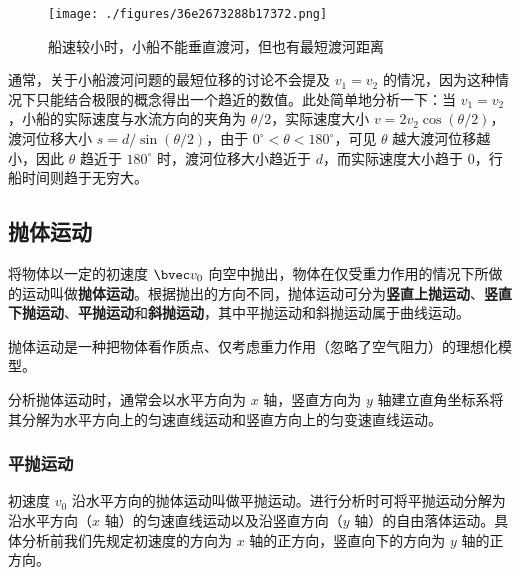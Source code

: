 \begin{figure}[ht]
\centering
\texttt{[image: ./figures/36e2673288b17372.png]}
\caption{船速较小时，小船不能垂直渡河，但也有最短渡河距离} \label{fig_HSPM04_2}
\end{figure}

通常，关于小船渡河问题的最短位移的讨论不会提及 $v_1=v_2$ 的情况，因为这种情况下只能结合极限的概念得出一个趋近的数值。此处简单地分析一下：当 $v_1=v_2$，小船的实际速度与水流方向的夹角为 $\theta /2$，实际速度大小 $v=2v_2\cos(\theta /2)$，渡河位移大小 $s= d/\sin(\theta/2)$，由于 $0^\circ < \theta < 180^\circ $，可见 $\theta$ 越大渡河位移越小，因此 $\theta$ 趋近于 $180^\circ $ 时，渡河位移大小趋近于 $d$，而实际速度大小趋于 $0$，行船时间则趋于无穷大。

\subsection{抛体运动}
将物体以一定的初速度 $\bvec v_0$ 向空中抛出，物体在仅受重力作用的情况下所做的运动叫做\textbf{抛体运动}。根据抛出的方向不同，抛体运动可分为\textbf{竖直上抛运动}、\textbf{竖直下抛运动}、\textbf{平抛运动}和\textbf{斜抛运动}，其中平抛运动和斜抛运动属于曲线运动。

抛体运动是一种把物体看作质点、仅考虑重力作用（忽略了空气阻力）的理想化模型。

分析抛体运动时，通常会以水平方向为 $x$ 轴，竖直方向为 $y$ 轴建立直角坐标系将其分解为水平方向上的匀速直线运动和竖直方向上的匀变速直线运动。

\subsubsection{平抛运动}
初速度 $v_0$ 沿水平方向的抛体运动叫做平抛运动。进行分析时可将平抛运动分解为沿水平方向（$x$ 轴）的匀速直线运动以及沿竖直方向（$y$ 轴）的自由落体运动。具体分析前我们先规定初速度的方向为 $x$ 轴的正方向，竖直向下的方向为 $y$ 轴的正方向。

